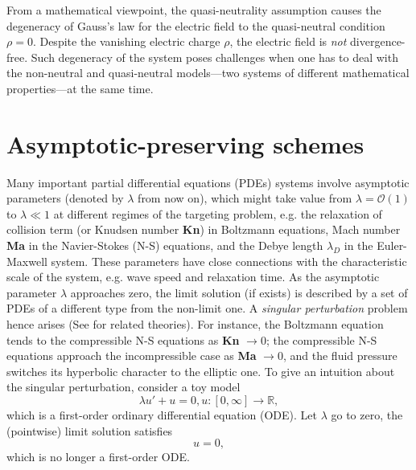 \documentclass{report}
\begin{document}
From a mathematical viewpoint, the quasi-neutrality assumption causes the degeneracy of Gauss's law for the electric field to the quasi-neutral condition $\rho = 0$. Despite the vanishing electric charge $\rho$, the electric field is \emph{not} divergence-free. Such degeneracy of the system poses challenges when one has to deal with the non-neutral and quasi-neutral models---two systems of different mathematical properties---at the same time.

\section{Asymptotic-preserving schemes}
 Many important partial differential equations (PDEs) systems involve asymptotic parameters (denoted by $\lambda$ from now on), which might take value from $\lambda = \mathcal{O}(1)$ to $\lambda \ll 1$ at different regimes of the targeting problem, e.g. the relaxation of collision term (or Knudsen number \textbf{Kn}) in Boltzmann equations, Mach number \textbf{Ma} in the Navier-Stokes (N-S) equations, and the Debye length $\lambda_D$ in the Euler-Maxwell system. These parameters have close connections with the characteristic scale of the system, e.g. wave speed and relaxation time. As the asymptotic parameter $\lambda$ approaches zero, the limit solution (if exists) is described by a set of PDEs of a different type from the non-limit one. A \emph{singular perturbation} problem hence arises (See \cite{mark_1995} for related theories). For instance, the Boltzmann equation tends to the compressible N-S equations as \textbf{Kn} $\rightarrow 0$; the compressible N-S equations approach the incompressible case as \textbf{Ma} $\rightarrow 0$, and the fluid pressure switches its hyperbolic character to the elliptic one. To give an intuition about the singular perturbation, consider a toy model
 \begin{equation} \label{equ:toy-model}
     \lambda u' + u = 0, u:[0,\infty]\rightarrow\mathbb{R},
 \end{equation}
 which is a first-order ordinary differential equation (ODE). Let $\lambda$ go to zero, the (pointwise) limit solution satisfies 
 \begin{equation*}
     u = 0,
 \end{equation*}
 which is no longer a first-order ODE.
 
\end{document}
